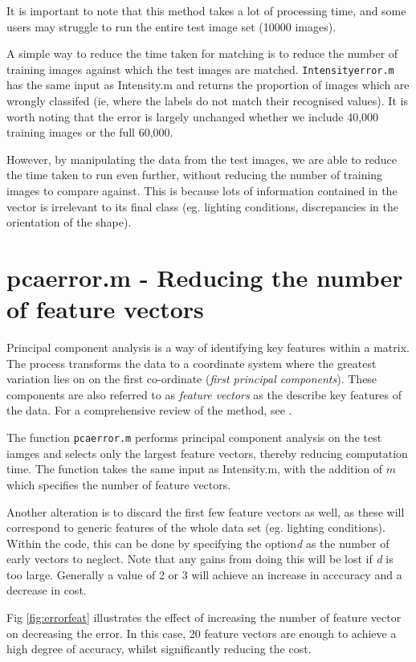\documentclass[12pt]{article}
\begin{document}
It is important to note that  this method takes a lot of processing time, and some users may struggle to run the entire test image set (10000 images). 

A simple way to reduce the time taken for matching is to reduce the number of training images against which the test images are matched. \texttt{Intensityerror.m} has the same input as Intensity.m and returns the proportion of images which are wrongly classifed (ie, where the labels do not match their recognised values). It is worth noting that the error is largely unchanged whether we include 40,000 training images or the full 60,000.

However, by manipulating the data from the test images, we are able to reduce the time taken to run even further, without reducing the number of training images to compare against. This is because lots of information contained in the vector is irrelevant to its final class (eg. lighting conditions, discrepancies in the orientation of the shape).

\section{pcaerror.m - Reducing the number of feature vectors}

Principal component analysis is a way of identifying key features within a matrix. The process transforms the data to a coordinate system where the greatest variation lies on on the first co-ordinate (\emph{first principal components}). These components are also referred to as \emph{feature vectors} as the describe key features of the data. For a comprehensive review of the method, see \cite{pca}.

The function \texttt{pcaerror.m} performs principal component analysis on the test iamges and selects only the largest feature vectors, thereby reducing computation time. The function takes the same input as Intensity.m, with the addition of \(m\) which specifies the number of feature vectors.

Another alteration is to discard the first few feature vectors as well, as these will correspond to generic features of the whole data set (eg. lighting conditions). Within the code, this can be done by specifying the option\emph{d} as the number of early vectors to neglect. Note that any gains from doing this will be lost if \emph{d} is too large. Generally a value of 2 or 3 will achieve an increase in acccuracy and a decrease in cost. 

Fig \ref{fig:errorfeat} illustrates the effect of increasing the number of feature vector on decreasing the error. In this case, 20 feature vectors are enough to achieve a high degree of accuracy, whilst significantly reducing the cost. 
\end{document}
